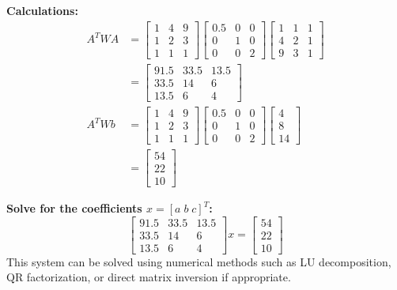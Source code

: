 \documentclass[8pt, a4paper, landscape]{extarticle} %
\begin{document}
\begin{multicols*}{4}
  \textbf{Calculations:}
  \begin{align*}
    A^T W A & = \begin{bmatrix} 1 & 4 & 9 \\ 1 & 2 & 3 \\ 1 & 1 & 1 \end{bmatrix} \begin{bmatrix} 0.5 & 0 & 0 \\ 0 & 1 & 0 \\ 0 & 0 & 2 \end{bmatrix} \begin{bmatrix} 1 & 1 & 1 \\ 4 & 2 & 1 \\ 9 & 3 & 1 \end{bmatrix} \\
            & = \begin{bmatrix} 91.5 & 33.5 & 13.5 \\ 33.5 & 14 & 6 \\ 13.5 & 6 & 4 \end{bmatrix}                                                                                                                       \\
    A^T W b & = \begin{bmatrix} 1 & 4 & 9 \\ 1 & 2 & 3 \\ 1 & 1 & 1 \end{bmatrix} \begin{bmatrix} 0.5 & 0 & 0 \\ 0 & 1 & 0 \\ 0 & 0 & 2 \end{bmatrix} \begin{bmatrix} 4 \\ 8 \\ 14 \end{bmatrix}                        \\
            & = \begin{bmatrix} 54 \\ 22 \\ 10 \end{bmatrix}
  \end{align*}

  \textbf{Solve for the coefficients \( x = [a \; b \; c]^T \):}
  \[
    \begin{bmatrix} 91.5 & 33.5 & 13.5 \\ 33.5 & 14 & 6 \\ 13.5 & 6 & 4 \end{bmatrix} x = \begin{bmatrix} 54 \\ 22 \\ 10 \end{bmatrix}
  \]
  This system can be solved using numerical methods such as LU decomposition, QR factorization, or direct matrix inversion if appropriate.


\end{multicols*}
\end{document}
